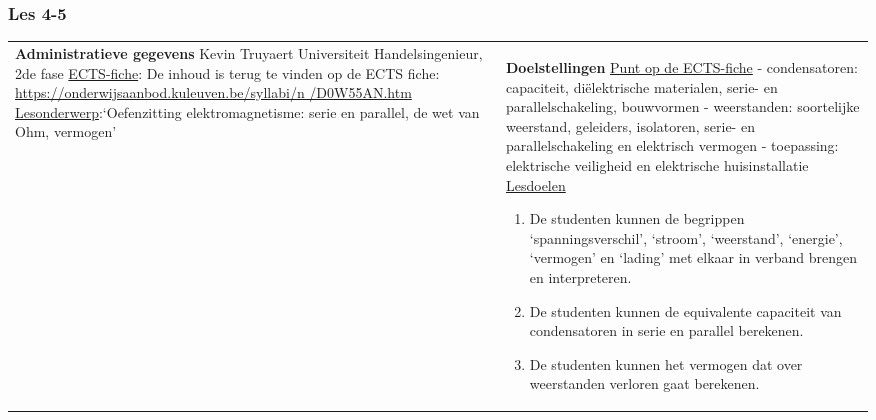 


\begin{landscape}
	
	\subsubsection{Les 4-5}
	\begin{tabularx}{1.56\textwidth}{|p{}|X|}\hline
		\textbf{Administratieve gegevens}\newline\newline
		Kevin Truyaert\newline\newline
		Universiteit\newline
		Handelsingenieur, 2de fase\newline
		\underline{ECTS-fiche}: De inhoud is terug te vinden op de ECTS fiche: \href{https://onderwijsaanbod.kuleuven.be/syllabi/n/D0W55AN.htm}{https://onderwijsaanbod.kuleuven.be/syllabi/n /D0W55AN.htm} \newline
		\underline{Lesonderwerp}:\newline `Oefenzitting elektromagnetisme: serie en parallel, de wet van Ohm, vermogen' & \textbf{Doelstellingen}\newline\vspace{0.5cm}
		\underline{Punt op de ECTS-fiche}
		\vspace{-0.5cm}\newline  - condensatoren: capaciteit, diëlektrische materialen, serie- en parallelschakeling, bouwvormen \newline
		- weerstanden: soortelijke weerstand, geleiders, isolatoren, serie- en parallelschakeling en elektrisch vermogen\newline
		- toepassing: elektrische veiligheid en elektrische huisinstallatie \newline
		\underline{Lesdoelen}\newline
		\vspace{-0.5cm}
		\begin{enumerate}[itemsep=0.08\baselineskip]
			\item De studenten kunnen de begrippen `spanningsverschil', `stroom', `weerstand', `energie', `vermogen' en `lading' met elkaar in verband brengen en interpreteren.
			\item De studenten kunnen de equivalente capaciteit van condensatoren in serie en parallel berekenen.
			\item De studenten kunnen het vermogen dat over weerstanden verloren gaat berekenen.

\end{enumerate}
\end{tabularx}
\end{landscape}
